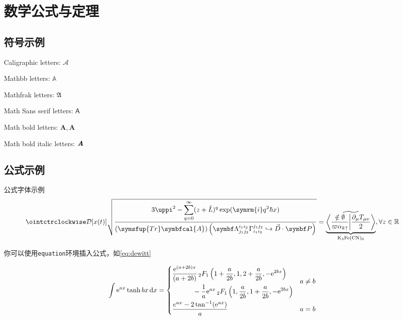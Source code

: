 \chapter{数学公式与定理}

\section{符号示例}

Caligraphic letters: $\mathcal{A}$

Mathbb letters: $\mathbb{A}$

Mathfrak letters: $\mathfrak{A}$

Math Sans serif letters: $\mathsf{A}$

Math bold letters: $\mathbf{A},\symbf{A}$

Math bold italic letters: $\textbf{\em A}$

\section{公式示例}

公式字体示例
\[
    \displaystyle \ointctrclockwise\mathcal{D}[x(t)]\sqrt{\frac{\displaystyle3\uppi^2-\sum_{q=0}^{\infty}(z+\hat L)^{q}\exp(\symrm{i}q^2 \hbar x)}{\displaystyle (\symsfup{Tr}\symbfcal{A})\left(\symbf\Lambda_{j_1j_2}^{i_1i_2}\Gamma_{i_1i_2}^{j_1j_2}\hookrightarrow\vec D\cdot \symbf P  \right)}}
    =\underbrace{\widetilde{\left\langle \frac{\notin \emptyset}{\varpi\alpha_{k\uparrow}}\middle\vert \frac{\partial_\mu T_{\mu\nu}}{2}\right\rangle}}_{\mathrm{K}_3\mathrm{Fe}(\mathrm{CN})_6} ,\forall z \in \mathbb{R}
\]

你可以使用\verb|equation|环境插入公式，如\cref{eq:dewitt}

\begin{equation}\label{eq:dewitt}
    \int \mathrm{e}^{ax} \tanh {bx} \, \mathrm{d}x =
    \begin{dcases}
        \begin{multlined}
            \frac{\mathrm{e}^{(a+2b)x}}{(a + 2b)} \,
            {{}_2F_1} \left( 1 + \frac{a}{2b}, 1, 2+\frac{a}{2b}, -\mathrm{e}^{2bx} \right) \\
            - \frac{1}{a} \mathrm{e}^{ax} \, {{}_2F_1} \left( 1, \frac{a}{2b}, 1 + \frac{a}{2b}, -\mathrm{e}^{2bx} \right)
        \end{multlined}
        & a \ne b \\
    \frac{e^{ax} - 2 \tan^{-1}(\mathrm{e}^{ax})}{a} & a = b
  \end{dcases}
\end{equation}


